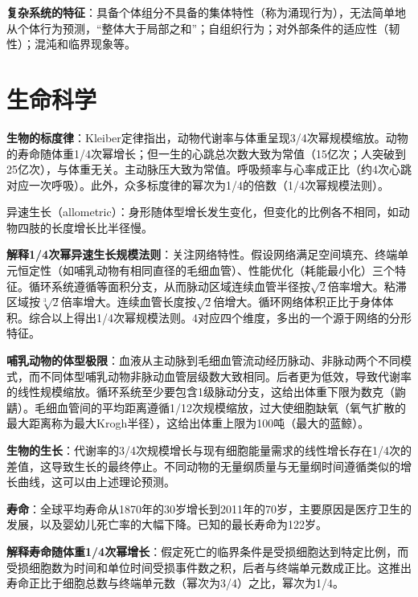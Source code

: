 \par \textbf{复杂系统的特征}：具备个体组分不具备的集体特性（称为涌现行为），无法简单地从个体行为预测，“整体大于局部之和”；自组织行为；对外部条件的适应性（韧性）；混沌和临界现象等。

\section{生命科学}

\par \textbf{生物的标度律}：Kleiber定律指出，动物代谢率与体重呈现3/4次幂规模缩放。动物的寿命随体重1/4次幂增长；但一生的心跳总次数大致为常值（15亿次；人突破到25亿次），与体重无关。主动脉压大致为常值。呼吸频率与心率成正比（约4次心跳对应一次呼吸）。此外，众多标度律的幂次为1/4的倍数（1/4次幂规模法则）。

\par 异速生长（allometric）：身形随体型增长发生变化，但变化的比例各不相同，如动物四肢的长度增长比半径慢。

\par \textbf{解释1/4次幂异速生长规模法则}：关注网络特性。假设网络满足空间填充、终端单元恒定性（如哺乳动物有相同直径的毛细血管）、性能优化（耗能最小化）三个特征。循环系统遵循等面积分支，从而脉动区域连续血管半径按$\sqrt{2}$倍率增大。粘滞区域按$\sqrt[3]{2}$倍率增大。连续血管长度按$\sqrt{2}$倍增大。循环网络体积正比于身体体积。综合以上得出1/4次幂规模法则。4对应四个维度，多出的一个源于网络的分形特征。

\par \textbf{哺乳动物的体型极限}：血液从主动脉到毛细血管流动经历脉动、非脉动两个不同模式，而不同体型哺乳动物非脉动血管层级数大致相同。后者更为低效，导致代谢率的线性规模缩放。循环系统至少要包含1级脉动分支，这给出体重下限为数克（{鼩鼱}）。毛细血管间的平均距离遵循1/12次规模缩放，过大使细胞缺氧（氧气扩散的最大距离称为最大Krogh半径），这给出体重上限为100吨（最大的蓝鲸）。

\par \textbf{生物的生长}：代谢率的3/4次规模增长与现有细胞能量需求的线性增长存在1/4次的差值，这导致生长的最终停止。不同动物的无量纲质量与无量纲时间遵循类似的增长曲线，这可以由上述理论预测。

\par \textbf{寿命}：全球平均寿命从1870年的30岁增长到2011年的70岁，主要原因是医疗卫生的发展，以及婴幼儿死亡率的大幅下降。已知的最长寿命为122岁。

\par \textbf{解释寿命随体重1/4次幂增长}：假定死亡的临界条件是受损细胞达到特定比例，而受损细胞数为时间和单位时间受损事件数之积，后者与终端单元数成正比。这推出寿命正比于细胞总数与终端单元数（幂次为3/4）之比，幂次为1/4。

